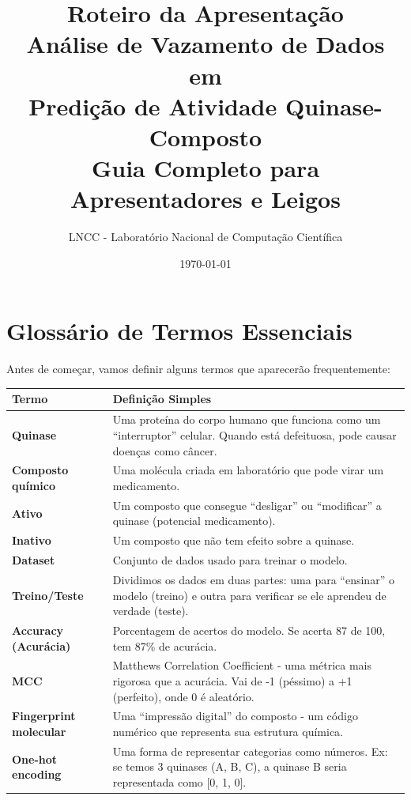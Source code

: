 \documentclass[11pt,a4paper]{article}
\title{
    \textcolor{lnccblue}{\textbf{Roteiro da Apresentação}}\\[0.5cm]
    \Large Análise de Vazamento de Dados em\\Predição de Atividade Quinase-Composto\\[0.5cm]
    \large Guia Completo para Apresentadores e Leigos
}
\author{LNCC - Laboratório Nacional de Computação Científica}
\date{\today}
\begin{document}
\maketitle
\tableofcontents
\newpage

\section{Glossário de Termos Essenciais}

Antes de começar, vamos definir alguns termos que aparecerão frequentemente:

\begin{longtable}{p{3.5cm}p{10cm}}
\toprule
\textbf{Termo} & \textbf{Definição Simples} \\
\midrule
\endhead
\textbf{Quinase} & Uma proteína do corpo humano que funciona como um ``interruptor'' celular. Quando está defeituosa, pode causar doenças como câncer. \\
\midrule
\textbf{Composto químico} & Uma molécula criada em laboratório que pode virar um medicamento. \\
\midrule
\textbf{Ativo} & Um composto que consegue ``desligar'' ou ``modificar'' a quinase (potencial medicamento). \\
\midrule
\textbf{Inativo} & Um composto que não tem efeito sobre a quinase. \\
\midrule
\textbf{Dataset} & Conjunto de dados usado para treinar o modelo. \\
\midrule
\textbf{Treino/Teste} & Dividimos os dados em duas partes: uma para ``ensinar'' o modelo (treino) e outra para verificar se ele aprendeu de verdade (teste). \\
\midrule
\textbf{Accuracy (Acurácia)} & Porcentagem de acertos do modelo. Se acerta 87 de 100, tem 87\% de acurácia. \\
\midrule
\textbf{MCC} & Matthews Correlation Coefficient - uma métrica mais rigorosa que a acurácia. Vai de -1 (péssimo) a +1 (perfeito), onde 0 é aleatório. \\
\midrule
\textbf{Fingerprint molecular} & Uma ``impressão digital'' do composto - um código numérico que representa sua estrutura química. \\
\midrule
\textbf{One-hot encoding} & Uma forma de representar categorias como números. Ex: se temos 3 quinases (A, B, C), a quinase B seria representada como [0, 1, 0]. \\
\bottomrule
\end{longtable}
\end{document}
